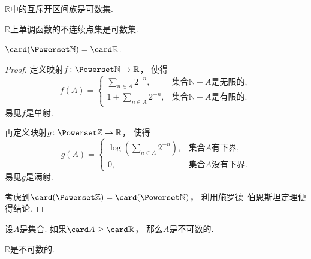 \begin{example}
\(\mathbb{R}\)中的互斥开区间族是可数集.
\end{example}

\begin{example}
\(\mathbb{R}\)上单调函数的不连续点集是可数集.
\end{example}

\begin{proposition}
\(\card(\Powerset\mathbb{N}) = \card\mathbb{R}\).
\begin{proof}
定义映射\(f\colon \Powerset\mathbb{N}\to\mathbb{R}\)，
使得\begin{equation*}
	f(A) = \left\{ \begin{array}{cl}
		\sum_{n \in A} 2^{-n}, & \text{集合$\mathbb{N}-A$是无限的}, \\
		1 + \sum_{n \in A} 2^{-n}, & \text{集合$\mathbb{N}-A$是有限的}.
	\end{array} \right.
\end{equation*}
易见\(f\)是单射.

再定义映射\(g\colon \Powerset\mathbb{Z}\to\mathbb{R}\)，
使得\begin{equation*}
	g(A) = \left\{ \begin{array}{cl}
		\log\left(\sum_{n \in A} 2^{-n}\right), & \text{集合$A$有下界}, \\
		0, & \text{集合$A$没有下界}.
	\end{array} \right.
\end{equation*}
易见\(g\)是满射.

考虑到\(\card(\Powerset\mathbb{Z}) = \card(\Powerset\mathbb{N})\)，
利用\hyperref[theorem:集合论.施罗德--伯恩斯坦定理]{施罗德--伯恩斯坦定理}便得结论.
\end{proof}
\end{proposition}

\begin{corollary}
设\(A\)是集合.
如果\(\card A \geq \card\mathbb{R}\)，
那么\(A\)是不可数的.
\end{corollary}

\begin{theorem}
\(\mathbb{R}\)是不可数的.
\end{theorem}

